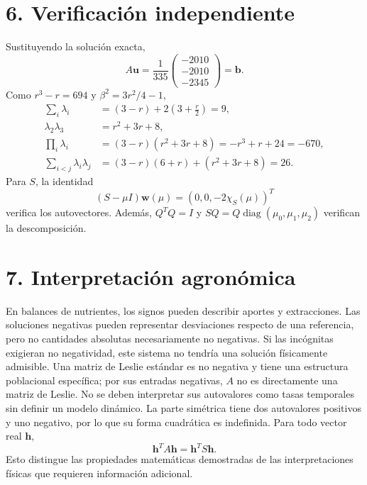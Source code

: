 \documentclass[spanish,letterpaper,oneside]{article}
\begin{document}
\section*{6. Verificación independiente}
Sustituyendo la solución exacta,
\begin{equation}
A\mathbf{u}=\frac1{335}\begin{pmatrix}-2010\\-2010\\-2345\end{pmatrix}=\mathbf{b}.
\end{equation}
Como $r^3-r=694$ y $\beta^2=3r^2/4-1$,
\begin{align}
\sum_i\lambda_i&=(3-r)+2\left(3+\frac r2\right)=9,\\
\lambda_2\lambda_3&=r^2+3r+8,\\
\prod_i\lambda_i&=(3-r)(r^2+3r+8)=-r^3+r+24=-670,\\
\sum_{i<j}\lambda_i\lambda_j&=(3-r)(6+r)+(r^2+3r+8)=26.
\end{align}
Para $S$, la identidad
\begin{equation}
(S-\mu I)\mathbf{w}(\mu)=(0,0,-2\chi_S(\mu))^T
\end{equation}
verifica los autovectores. Además, $Q^TQ=I$ y $SQ=Q\operatorname{diag}(\mu_0,\mu_1,\mu_2)$ verifican la descomposición.
\noindent{}

\section*{7. Interpretación agronómica}
En balances de nutrientes, los signos pueden describir aportes y extracciones. Las soluciones negativas pueden representar desviaciones respecto de una referencia, pero no cantidades absolutas necesariamente no negativas. Si las incógnitas exigieran no negatividad, este sistema no tendría una solución físicamente admisible.
Una matriz de Leslie estándar es no negativa y tiene una estructura poblacional específica; por sus entradas negativas, $A$ no es directamente una matriz de Leslie. No se deben interpretar sus autovalores como tasas temporales sin definir un modelo dinámico.
La parte simétrica tiene dos autovalores positivos y uno negativo, por lo que su forma cuadrática es indefinida. Para todo vector real $\mathbf{h}$,
\begin{equation}
\mathbf{h}^TA\mathbf{h}=\mathbf{h}^TS\mathbf{h}.
\end{equation}
Esto distingue las propiedades matemáticas demostradas de las interpretaciones físicas que requieren información adicional.
\end{document}

